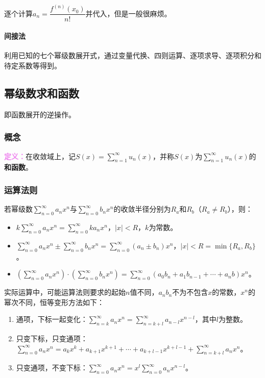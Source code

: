 \documentclass[UTF8, 12pt]{ctexart}
\begin{document}
        逐个计算$a_n=\dfrac{f^{(n)}(x_0)}{n!}$并代入，但是一般很麻烦。

        \paragraph{间接法} \leavevmode \medskip

        利用已知的七个幂级数展开式，通过变量代换、四则运算、逐项求导、逐项积分和待定系数等得到。

        \subsection{幂级数求和函数}

        即函数展开的逆操作。

        \subsubsection{概念}

        \textcolor{violet}{\textbf{定义：}}在收敛域上，记$S(x)=\sum\limits_{n=1}^\infty u_n(x)$，并称$S(x)$为$\sum\limits_{n=1}^\infty u_n(x)$的\textbf{和函数}。

        \subsubsection{运算法则}

        若幂级数$\sum\limits_{n=0}^\infty a_nx^n$与$\sum\limits_{n=0}^\infty b_nx^n$的收敛半径分别为$R_a$和$R_b$（$R_a\neq R_b$），则：

        \begin{itemize}
            \item $k\sum\limits_{n=0}^\infty a_nx^n=\sum\limits_{n=0}^\infty ka_nx^n$，$\vert x\vert<R$，$k$为常数。
            \item $\sum\limits_{n=0}^\infty a_nx^n\pm\sum\limits_{n=0}^\infty b_nx^n=\sum\limits_{n=0}^\infty (a_n\pm b_n)x^n$，$\vert x\vert<R=\min\{R_a,R_b\}$。
            \item $(\sum\limits_{n=0}^\infty a_nx^n)\cdot(\sum\limits_{n=0}^\infty b_nx^n)=\sum\limits_{n=0}^\infty(a_0b_n+a_1b_{n-1}+\cdots+a_nb)x^n$。
        \end{itemize}

        实际运算中，可能运算法则要求的起始$n$值不同，$a_nb_n$不为不包含$x$的常数，$x^n$的幂次不同，恒等变形方法如下：

        \begin{enumerate}
            \item 通项，下标一起变化：$\sum\limits_{n=k}^\infty a_nx^n=\sum\limits_{n=k+l}^\infty a_{n-l}x^{n-l}$，其中$l$为整数。
            \item 只变下标，只变通项：$\sum\limits_{n=0}^\infty a_nx^n=a_kx^k+a_{k+1}x^{k+1}+\cdots+a_{k+l-1}x^{k+l-1}+\sum\limits_{n=k+l}^\infty a_nx^n$。
            \item 只变通项，不变下标：$\sum\limits_{n=0}^\infty a_nx^n=x^l\sum\limits_{n=0}^\infty a_nx^{n-l}$。
        \end{enumerate}
\end{document}
